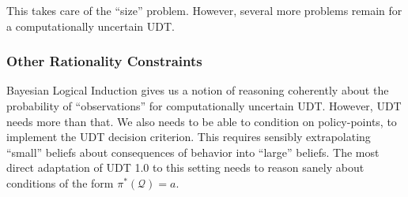 \documentclass{article}
\begin{document}

This takes care of the ``size'' problem. However, several more problems remain for a computationally uncertain UDT.

\subsubsection{Other Rationality Constraints}

Bayesian Logical Induction gives us a notion of reasoning coherently about the probability of ``observations'' for computationally uncertain UDT. However, UDT needs more than that. We also needs to be able to condition on policy-points, to implement the UDT decision criterion. This requires sensibly extrapolating ``small'' beliefs about consequences of behavior into ``large'' beliefs. The most direct adaptation of UDT 1.0 to this setting needs to reason sanely about conditions of the form $\pi^*(\mathcal{Q})=a$. 
\end{document}
